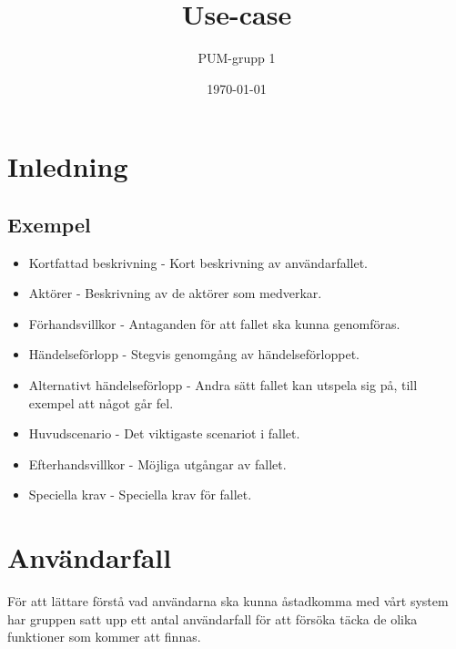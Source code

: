 

\ifpdf
\else
\fi

\title{Use-case}
\author{PUM-grupp 1}
\date{\today}



\maketitle\thispagestyle{empty}

\newpage

\section{Inledning}


\subsection{Exempel}
\begin{itemize}
	\item Kortfattad beskrivning - Kort beskrivning av användarfallet.
	\item Aktörer - Beskrivning av de aktörer som medverkar.
	\item Förhandsvillkor - Antaganden för att fallet ska kunna genomföras.
	\item Händelseförlopp - Stegvis genomgång av händelseförloppet.
	\item Alternativt händelseförlopp - Andra sätt fallet kan utspela sig på, till exempel att något går fel.
	\item Huvudscenario - Det viktigaste scenariot i fallet.
	\item Efterhandsvillkor - Möjliga utgångar av fallet.
	\item Speciella krav - Speciella krav för fallet.
\end{itemize}

\section{Användarfall} 

För att lättare förstå vad användarna ska kunna åstadkomma med vårt system har gruppen satt upp ett antal användarfall för att försöka täcka de olika funktioner som kommer att finnas.

